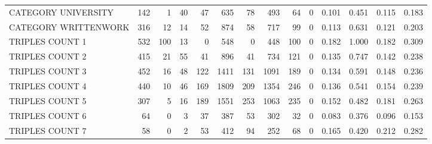 \begin{tabular}{lrrrrrrrrrllll}
 CATEGORY UNIVERSITY      &             142 &             1 &              40 &              47 &             635 &   78 &  493 &   64 &    0 & 0.101 & 0.451 & 0.115 & 0.183 \\
 CATEGORY WRITTENWORK     &             316 &            12 &              14 &              52 &             874 &   58 &  717 &   99 &    0 & 0.113 & 0.631 & 0.121 & 0.203 \\
 TRIPLES COUNT 1          &             532 &           100 &              13 &               0 &             548 &    0 &  448 &  100 &    0 & 0.182 & 1.000 & 0.182 & 0.309 \\
 TRIPLES COUNT 2          &             415 &            21 &              55 &              41 &             896 &   41 &  734 &  121 &    0 & 0.135 & 0.747 & 0.142 & 0.238 \\
 TRIPLES COUNT 3          &             452 &            16 &              48 &             122 &            1411 &  131 & 1091 &  189 &    0 & 0.134 & 0.591 & 0.148 & 0.236 \\
 TRIPLES COUNT 4          &             440 &            10 &              46 &             169 &            1809 &  209 & 1354 &  246 &    0 & 0.136 & 0.541 & 0.154 & 0.239 \\
 TRIPLES COUNT 5          &             307 &             5 &              16 &             189 &            1551 &  253 & 1063 &  235 &    0 & 0.152 & 0.482 & 0.181 & 0.263 \\
 TRIPLES COUNT 6          &              64 &             0 &               3 &              37 &             387 &   53 &  302 &   32 &    0 & 0.083 & 0.376 & 0.096 & 0.153 \\
 TRIPLES COUNT 7          &              58 &             0 &               2 &              53 &             412 &   94 &  252 &   68 &    0 & 0.165 & 0.420 & 0.212 & 0.282 \\
\hline
\end{tabular}